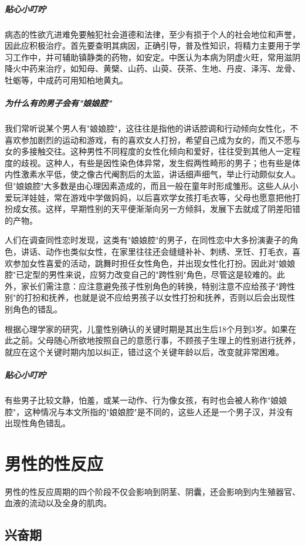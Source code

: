 \begin{enumerate}
\subparagraph{贴心小叮咛}

病态的性欲亢进难免要触犯社会道德和法律，至少有损于个人的社会地位和声誉，因此应积极治疗。首先要查明其病因，正确引导，普及性知识，将精力主要用于学习工作中，并可辅助镇静类的药物，如安定。中医认为本病为阴虚火旺，常用滋阴降火中药来治疗，如知母、黄檗、山药、山萸、茯茶、生地、丹皮、泽泻、龙骨、牡蛎等，中成药可用知柏地黄丸。

\subparagraph{为什么有的男子会有"娘娘腔"}

我们常听说某个男人有"娘娘腔"，这往往是指他的讲话腔调和行动倾向女性化，不喜欢参加剧烈的运动和游戏，有的喜欢女人打扮，希望自己成为女的，而又不愿与女的多接触交往。这种男性不同程度的女性化倾向和爱好，往往受到其他人一定程度的歧视。这种人，有些是因性染色体异常，发生假两性畸形的男子；也有些是体内性激素水平低，使之像古代阉割后的太监，讲话细声细气，举止行动颇似女人。但"娘娘腔"大多数是由心理因素造成的，而且一般在童年时形成雏形。这些人从小爱玩洋娃娃，常在游戏中学做妈妈，以后喜欢学女孩打毛衣等，父母也愿意把他打扮成女孩。这样，早期性别的天平便渐渐向另一方倾斜，发展下去就成了阴差阳错的产物。

人们在调查同性恋时发现，这类有"娘娘腔"的男子，在同性恋中大多扮演妻子的角色，讲话、动作也类似女性，在家里往往还会缝缝补补、刺绣、烹饪、打毛衣，喜欢参加女性喜爱的活动，跳舞时担任女性角色，并出现女性化打扮。因此对"娘娘腔"已定型的男性来说，应努力改变自己的"跨性别"角色，尽管这是较难的。此外，家长们需注意：应注意避免孩子性别角色的转换，特别注意不应给孩子"跨性别"的打扮和抚养，也就是说不应给男孩子以女性打扮和抚养，否则以后会出现性别角色的错乱。

根据心理学家的研究，儿童性别确认的关键时期是其出生后18个月到3岁。如果在此之前。父母随心所欲地按照自己的意愿行事，不顾孩子生理上的性别进行抚养，就应在这个关键时期内加以纠正，错过这个关键年龄以后，改变就非常困难。

\subparagraph{贴心小叮咛}

有些男子比较文静，怕羞，或某一动作、行为像女孩，有时也会被人称作"娘娘腔"，这种情况与本文所指的"娘娘腔"是不同的，这些人还是一个男子汉，并没有出现性角色错乱。

\section{男性的性反应}

男性的性反应周期的四个阶段不仅会影响到阴茎、阴囊，还会影响到内生殖器官、血液的流动以及全身的肌肉。

\subsection{兴奋期}


\end{enumerate}
